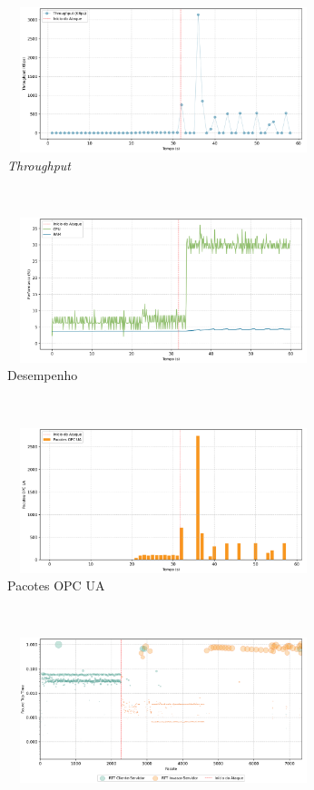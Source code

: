 \begin{apendicesenv}
\begin{figure}[htbp!]
    \centering
    \begin{subfigure}[t]{0.5\textwidth}
        \centering
        \includegraphics[width=1\textwidth, height=120pt]{USPSC-img/output/cropped/0-dos_function_call_null_deref-tput.png}
        \caption{\textit{Throughput}}
    \end{subfigure}%
    ~ 
    \begin{subfigure}[t]{0.5\textwidth}
        \centering
        \includegraphics[width=1\textwidth, height=120pt]{USPSC-img/output/cropped/0-dos_function_call_null_deref-perf.png}
        \caption{Desempenho}
    \end{subfigure}%
    \\
    \begin{subfigure}[t]{0.5\textwidth}
        \centering
        \includegraphics[width=1\textwidth, height=120pt]{USPSC-img/output/cropped/0-dos_function_call_null_deref-pack.png}
        \caption{Pacotes OPC UA}
    \end{subfigure}%
    ~
    \begin{subfigure}[t]{0.5\textwidth}
        \centering
        \includegraphics[width=1\textwidth, height=120pt]{USPSC-img/output/cropped/0-dos_function_call_null_deref-rttp.png}

\end{subfigure}
\end{figure}
\end{apendicesenv}
